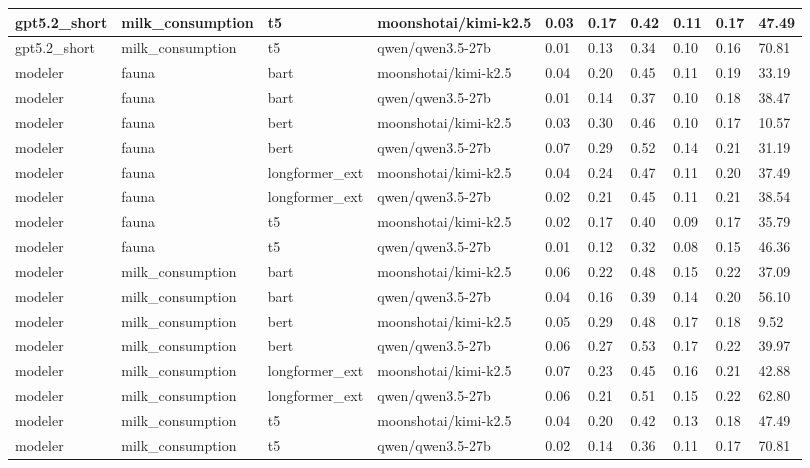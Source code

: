 \begin{tabular}{|l|l|l|l|l|l|l|l|l|l|}
 gpt5.2\_short & milk\_consumption & t5 & moonshotai/kimi-k2.5 & 0.03 & 0.17 & 0.42 & 0.11 & 0.17 & 47.49 \\
 \hline
 gpt5.2\_short & milk\_consumption & t5 & qwen/qwen3.5-27b & 0.01 & 0.13 & 0.34 & 0.10 & 0.16 & 70.81 \\
 \hline
 modeler & fauna & bart & moonshotai/kimi-k2.5 & 0.04 & 0.20 & 0.45 & 0.11 & 0.19 & 33.19 \\
 \hline
 modeler & fauna & bart & qwen/qwen3.5-27b & 0.01 & 0.14 & 0.37 & 0.10 & 0.18 & 38.47 \\
 \hline
 modeler & fauna & bert & moonshotai/kimi-k2.5 & 0.03 & 0.30 & 0.46 & 0.10 & 0.17 & 10.57 \\
 \hline
 modeler & fauna & bert & qwen/qwen3.5-27b & 0.07 & 0.29 & 0.52 & 0.14 & 0.21 & 31.19 \\
 \hline
 modeler & fauna & longformer\_ext & moonshotai/kimi-k2.5 & 0.04 & 0.24 & 0.47 & 0.11 & 0.20 & 37.49 \\
 \hline
 modeler & fauna & longformer\_ext & qwen/qwen3.5-27b & 0.02 & 0.21 & 0.45 & 0.11 & 0.21 & 38.54 \\
 \hline
 modeler & fauna & t5 & moonshotai/kimi-k2.5 & 0.02 & 0.17 & 0.40 & 0.09 & 0.17 & 35.79 \\
 \hline
 modeler & fauna & t5 & qwen/qwen3.5-27b & 0.01 & 0.12 & 0.32 & 0.08 & 0.15 & 46.36 \\
 \hline
 modeler & milk\_consumption & bart & moonshotai/kimi-k2.5 & 0.06 & 0.22 & 0.48 & 0.15 & 0.22 & 37.09 \\
 \hline
 modeler & milk\_consumption & bart & qwen/qwen3.5-27b & 0.04 & 0.16 & 0.39 & 0.14 & 0.20 & 56.10 \\
 \hline
 modeler & milk\_consumption & bert & moonshotai/kimi-k2.5 & 0.05 & 0.29 & 0.48 & 0.17 & 0.18 & 9.52 \\
 \hline
 modeler & milk\_consumption & bert & qwen/qwen3.5-27b & 0.06 & 0.27 & 0.53 & 0.17 & 0.22 & 39.97 \\
 \hline
 modeler & milk\_consumption & longformer\_ext & moonshotai/kimi-k2.5 & 0.07 & 0.23 & 0.45 & 0.16 & 0.21 & 42.88 \\
 \hline
 modeler & milk\_consumption & longformer\_ext & qwen/qwen3.5-27b & 0.06 & 0.21 & 0.51 & 0.15 & 0.22 & 62.80 \\
 \hline
 modeler & milk\_consumption & t5 & moonshotai/kimi-k2.5 & 0.04 & 0.20 & 0.42 & 0.13 & 0.18 & 47.49 \\
 \hline
 modeler & milk\_consumption & t5 & qwen/qwen3.5-27b & 0.02 & 0.14 & 0.36 & 0.11 & 0.17 & 70.81 \\
\hline
\end{tabular}
